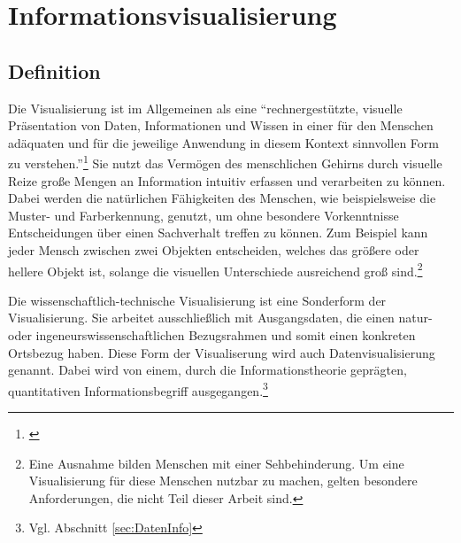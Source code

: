 \documentclass[a4paper, 
               12pt,
               DIV=calc,
               version=first,
               pdftex,
               headsepline,
               footsepline,
               bibtotocnumbered,
               liststotocnumbered]{scrreprt}
\begin{document}
\chapter{Informationsvisualisierung}
\label{cha:Informationsvisualisierung}
\section{Definition}
\label{sec:Definition}
Die Visualisierung ist im Allgemeinen als eine "`rechnergestützte, visuelle Präsentation von Daten, Informationen und Wissen
in einer für den Menschen adäquaten und für die jeweilige Anwendung in diesem Kontext sinnvollen Form
zu verstehen."'\footnote{\citep[S.\,3]{Schumann}}
Sie nutzt das Vermögen des menschlichen Gehirns durch visuelle Reize große Mengen an Information
intuitiv erfassen und verarbeiten zu können. Dabei werden die natürlichen Fähigkeiten des Menschen,
wie beispielsweise die Muster- und Farberkennung, genutzt, um ohne besondere Vorkenntnisse Entscheidungen über
einen Sachverhalt treffen zu können. Zum Beispiel kann jeder Mensch zwischen zwei Objekten entscheiden,
welches das größere oder hellere Objekt ist, solange die visuellen Unterschiede ausreichend groß sind.\footnote{
Eine Ausnahme bilden Menschen mit einer Sehbehinderung. Um eine Visualisierung für diese Menschen
nutzbar zu machen, gelten besondere Anforderungen, die nicht Teil dieser Arbeit sind.}

Die wissenschaftlich-technische Visualisierung ist eine Sonderform der Visualisierung. Sie arbeitet ausschließlich mit Ausgangsdaten,
die einen natur- oder ingeneurswissenschaftlichen Bezugsrahmen und somit einen konkreten Ortsbezug haben. Diese Form der
Visualiserung wird auch Datenvisualisierung genannt. Dabei wird von einem, durch die Informationstheorie
geprägten, quantitativen Informationsbegriff ausgegangen.\footnote{Vgl. 
Abschnitt \ref{sec:DatenInfo}}
\end{document}
